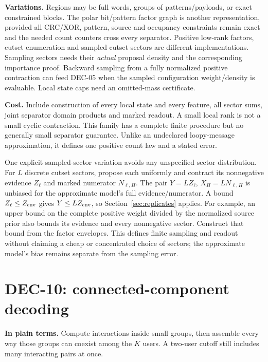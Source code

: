 \documentclass[10pt,a4paper]{article}
\begin{document}
\textbf{Variations.} Regions may be full words, groups of patterns/payloads, or exact constrained blocks.
The polar bit/pattern factor graph is another representation, provided all CRC/XOR, pattern, source and
occupancy constraints remain exact and the needed count counters cross every separator.
Positive low-rank factors, cutset enumeration and sampled cutset sectors are different implementations.
Sampling sectors needs their \emph{actual} proposal density and the corresponding importance proof.
Backward sampling from a fully normalized positive contraction can feed DEC-05 when the sampled
configuration weight/density is evaluable. Local state caps need an omitted-mass certificate.

\textbf{Cost.} Include construction of every local state and every feature, all sector sums, joint
separator domain products and marked readout. A small local rank is not a small cyclic contraction.
This family has a complete finite procedure but no generally small separator guarantee.
Unlike an undeclared loopy-message approximation, it defines one positive count law and a stated error.

One explicit sampled-sector variation avoids any unspecified sector distribution.
For $L$ discrete cutset sectors, propose each uniformly and contract its nonnegative evidence $Z_\ell$
and marked numerator $N_{\ell,H}$. The pair $Y=LZ_\ell$, $X_H=LN_{\ell,H}$ is unbiased for the
approximate model's full evidence/numerator. A bound $Z_\ell\leq Z_{\rm env}$ gives
$Y\leq LZ_{\rm env}$, so Section~\ref{sec:replicates} applies.
For example, an upper bound on the complete positive weight divided by the normalized source prior
also bounds its evidence and every nonnegative sector. Construct that bound from the factor envelopes.
This defines finite sampling and readout without claiming a cheap or concentrated choice of sectors;
the approximate model's bias remains separate from the sampling error.

\clearpage
\section{DEC-10: connected-component decoding}
\label{sec:connected}
\textbf{In plain terms.} Compute interactions inside small groups, then assemble every way those groups
can coexist among the $K$ users. A two-user cutoff still includes many interacting pairs at once.
\end{document}
